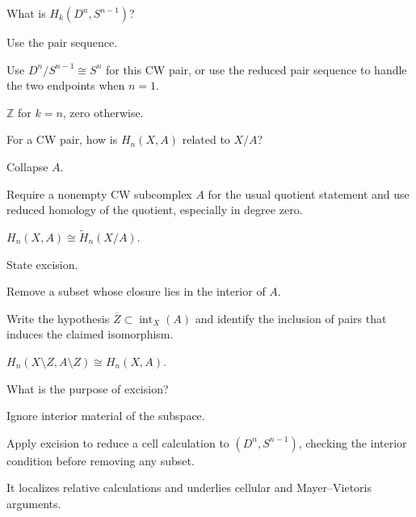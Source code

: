 \begin{exercise}\label{exr:viii19-11}
What is \(H_k(D^n,S^{n-1})\)?
\end{exercise}
\begin{hint}
Use the pair sequence.

Use \(D^n/S^{n-1}\cong S^n\) for this CW pair, or use the reduced pair sequence to handle the two endpoints when \(n=1\).
\end{hint}
\begin{solution}
\(\mathbb Z\) for \(k=n\), zero otherwise.
\end{solution}

\begin{exercise}\label{exr:viii19-12}
For a CW pair, how is \(H_n(X,A)\) related to \(X/A\)?
\end{exercise}
\begin{hint}
Collapse \(A\).

Require a nonempty CW subcomplex \(A\) for the usual quotient statement and use reduced homology of the quotient, especially in degree zero.
\end{hint}
\begin{solution}
\(H_n(X,A)\cong\widetilde H_n(X/A)\).
\end{solution}

\begin{exercise}\label{exr:viii19-13}
State excision.
\end{exercise}
\begin{hint}
Remove a subset whose closure lies in the interior of \(A\).

Write the hypothesis \(\overline Z\subset\operatorname{int}_X(A)\) and identify the inclusion of pairs that induces the claimed isomorphism.
\end{hint}
\begin{solution}
\(H_n(X\setminus Z,A\setminus Z)\cong H_n(X,A)\).
\end{solution}

\begin{exercise}\label{exr:viii19-14}
What is the purpose of excision?
\end{exercise}
\begin{hint}
Ignore interior material of the subspace.

Apply excision to reduce a cell calculation to \((D^n,S^{n-1})\), checking the interior condition before removing any subset.
\end{hint}
\begin{solution}
It localizes relative calculations and underlies cellular and Mayer--Vietoris arguments.
\end{solution}

